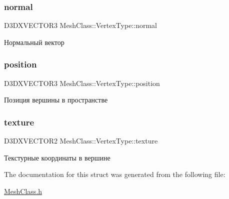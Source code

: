 \subsubsection{\texorpdfstring{normal}{normal}}
{\footnotesize\ttfamily D3\+D\+X\+V\+E\+C\+T\+O\+R3 Mesh\+Class\+::\+Vertex\+Type\+::normal}



Нормальный вектор 

\mbox{\label{struct_mesh_class_1_1_vertex_type_a1a6431f79df56f423b71a20f71e8154c}} 
\subsubsection{\texorpdfstring{position}{position}}
{\footnotesize\ttfamily D3\+D\+X\+V\+E\+C\+T\+O\+R3 Mesh\+Class\+::\+Vertex\+Type\+::position}



Позиция вершины в пространстве 

\mbox{\label{struct_mesh_class_1_1_vertex_type_a3b5de88da6b8120a8d14adcd8ebf1538}} 
\subsubsection{\texorpdfstring{texture}{texture}}
{\footnotesize\ttfamily D3\+D\+X\+V\+E\+C\+T\+O\+R2 Mesh\+Class\+::\+Vertex\+Type\+::texture}



Текстурные координаты в вершине 



The documentation for this struct was generated from the following file\+:\begin{DoxyCompactItemize}
\item 
\hyperlink{_mesh_class_8h}{Mesh\+Class.\+h}\end{DoxyCompactItemize}
